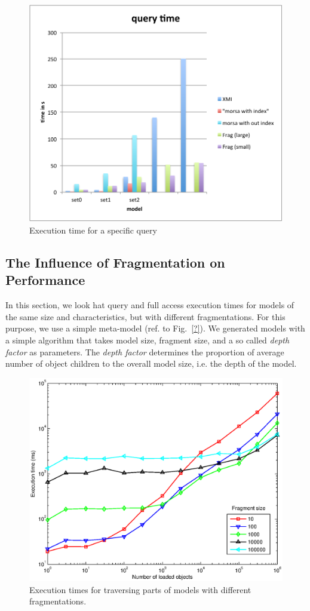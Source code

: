 
\begin{figure}
  \centering
  \includegraphics[width=0.65\linewidth]{figures/grabatsQuery}
  \caption{Execution time for a specific query}
  \label{fig:grabatsQuery}
\end{figure}

\subsection{The Influence of Fragmentation on Performance}

In this section, we look hat query and full access execution times for models of the same size and characteristics, but with different fragmentations. For this purpose, we use a simple meta-model (ref. to Fig.~\ref{?}). We generated models with a simple algorithm that takes model size, fragment size, and a so called \emph{depth factor} as parameters. The \emph{depth factor} determines the proportion of average number of object children to the overall model size, i.e. the depth of the model. 

\begin{figure}
  \centering
  \includegraphics[width=0.65\linewidth]{figures/fragBroadTestModel}
  \caption{Execution times for traversing parts of models with different fragmentations.}
  \label{fig:fragBroadModel}
\end{figure}

